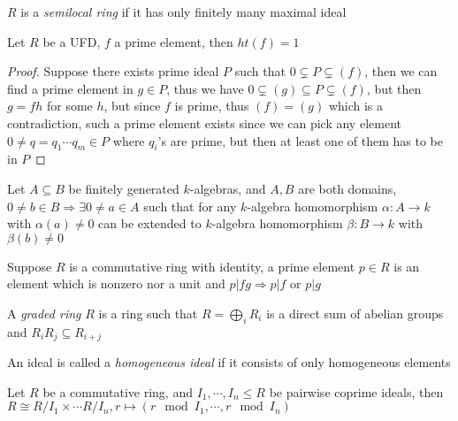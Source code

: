 \documentclass[main]{subfiles}
\begin{document}
\begin{definition}
$R$ is a \textit{semilocal ring} if it has only finitely many maximal ideal
\end{definition}

\begin{proposition}
Let $R$ be a UFD, $f$ a prime element, then $ht(f)=1$
\end{proposition}

\begin{proof}
Suppose there exists prime ideal $P$ such that $0\subsetneq P\subsetneq (f)$, then we can find a prime element in $g\in P$, thus we have $0\subsetneq(g)\subseteq P\subsetneq (f)$, but then $g=fh$ for some $h$, but since $f$ is prime, thus $(f)=(g)$ which is a contradiction, such a prime element exists since we can pick any element $0\neq q=q_1\cdots q_m\in P$ where $q_i$'s are prime, but then at least one of them has to be in $P$
\end{proof}

\begin{theorem}
Let $A\subseteq B$ be finitely generated $k$-algebras, and $A,B$ are both domains, $0\neq b\in B\Rightarrow\exists0\neq a\in A$ such that for any $k$-algebra homomorphism $\alpha:A\to k$ with $\alpha(a)\neq0$ can be extended to $k$-algebra homomorphism $\beta:B\to k$ with $\beta(b)\neq0$
\end{theorem}

\begin{definition}
Suppose $R$ is a commutative ring with identity, a prime element $p\in R$ is an element which is nonzero nor a unit and $p|fg\Rightarrow p|f$ or $p|g$
\end{definition}

\begin{definition}
A \textit{graded ring} $R$ is a ring such that $R=\displaystyle\bigoplus_{i} R_i$ is a direct sum of abelian groups and $R_iR_j\subseteq R_{i+j}$ \par
An ideal is called a \textit{homogeneous ideal} if it consists of only homogeneous elements \par
\end{definition}

\begin{theorem}\label{Chinese remainder theorem}
Let $R$ be a commutative ring, and $I_1,\cdots, I_n\leq R$ be pairwise coprime ideals, then $R\cong R/I_1\times\cdots R/I_n, r\mapsto (r\mod I_1,\cdots,r\mod I_n)$
\end{theorem}
\end{document}
